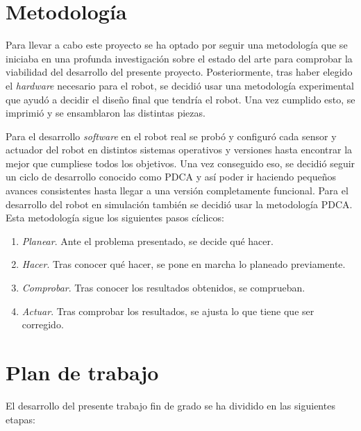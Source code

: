 \section{Metodología}
\label{sec:metodologia}

Para llevar a cabo este proyecto se ha optado por seguir una metodología que se iniciaba en una profunda investigación sobre el estado del arte para comprobar la viabilidad del desarrollo del presente proyecto. Posteriormente, tras haber elegido el \textit{hardware} necesario para el robot, se decidió usar una metodología experimental que ayudó a decidir el diseño final que tendría el robot. Una vez cumplido esto, se imprimió y se ensamblaron las distintas piezas. 


Para el desarrollo \textit{software} en el robot real se probó y configuró cada sensor y actuador del robot en distintos sistemas operativos y versiones hasta encontrar la mejor que cumpliese todos los objetivos. Una vez conseguido eso, se decidió seguir un ciclo de desarrollo conocido como \ac{PDCA} y así poder ir haciendo pequeños avances consistentes hasta llegar a una versión completamente funcional. Para el desarrollo del robot en simulación también se decidió usar la metodología \acs{PDCA}. Esta metodología sigue los siguientes pasos cíclicos: 

\begin{enumerate}
	\item{\textit{Planear}}. Ante el problema presentado, se decide qué hacer.
	
	\item{\textit{Hacer}}. Tras conocer qué hacer, se pone en marcha lo planeado previamente.
	
	\item{\textit{Comprobar}}. Tras conocer los resultados obtenidos, se comprueban.
	
	\item{\textit{Actuar}}. Tras comprobar los resultados, se ajusta lo que tiene que ser corregido. 

\end{enumerate}


\section{Plan de trabajo}
\label{sec:plantrabajo}

El desarrollo del presente trabajo fin de grado se ha dividido en las siguientes etapas: 

